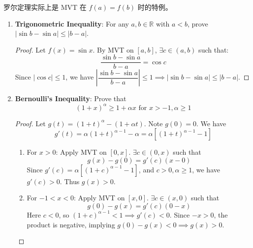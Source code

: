 \documentclass[
	UTF-8,
	11pt, %
	a4paper, %
]{LegrandOrangeBook}
\begin{document}
    \begin{remark}
        罗尔定理实际上是 MVT 在 $f(a)=f(b)$ 时的特例。
    \end{remark}

    \newpage

    \begin{example}\quad
    \begin{enumerate}
        \item \textbf{Trigonometric Inequality}: For any $a, b \in \mathbb{R}$ with $a < b$, 
        prove $|\sin b - \sin a| \le |b - a|$.
        \begin{proof}
            Let $f(x) = \sin x$. By MVT on $[a, b]$, $\exists c \in (a, b)$ such that:
            \[ \frac{\sin b - \sin a}{b - a} = \cos c \]
            Since $|\cos c| \le 1$, 
            we have $\left|\dfrac{\sin b - \sin a}{b - a}\right| \le 1 \implies |\sin b - \sin a| \le |b - a|$.
        \end{proof}
        
        
        \item \textbf{Bernoulli's Inequality}: Prove that
        $$
        \text{$(1+x)^\alpha \ge 1 + \alpha x$ for $x > -1, \alpha \ge 1$}
        $$
        \begin{proof}
            Let $g(t) = (1+t)^\alpha - (1+\alpha t)$. Note $g(0) = 0$. We have
            $$g'(t) = \alpha(1+t)^{\alpha-1} - \alpha = \alpha[(1+t)^{\alpha-1} - 1]$$ 
            \begin{enumerate}
                \item For $x > 0$: Apply MVT on $[0, x]$. $\exists c \in (0, x)$ such that
                $$g(x) - g(0) = g'(c)(x - 0)$$
                Since $g'(c) = \alpha[(1+c)^{\alpha-1} - 1]$, 
                and $c > 0, \alpha \ge 1$, we have $g'(c) > 0$. Thus $g(x) > 0$.

                \item For $-1 < x < 0$: Apply MVT on $[x, 0]$. $\exists c \in (x, 0)$ such that 
                $$g(0) - g(x) = g'(c)(0 - x)$$
                Here $c < 0$, so $(1+c)^{\alpha-1} < 1 \implies g'(c) < 0$. 
                Since $-x > 0$, the product is negative, implying $g(0) - g(x) < 0 \implies g(x) > 0$.
            \end{enumerate}
        \end{proof}
    \end{enumerate}
    \end{example}
\end{document}
